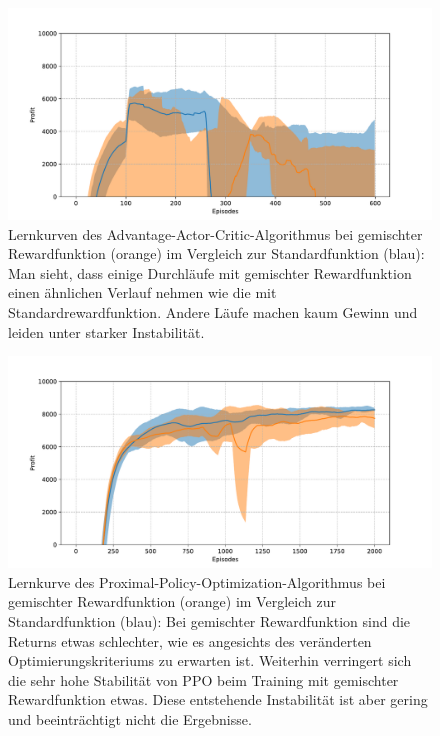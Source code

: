 \begin{figure}[htb]
	\centering
	\includegraphics[width=\textwidth]{appendix/mixed_rewards_a2c.pdf}
	\caption{
		Lernkurven des Advantage-Actor-Critic-Algorithmus bei gemischter Rewardfunktion (orange) im Vergleich zur Standardfunktion (blau):
		Man sieht, dass einige Durchläufe mit gemischter Rewardfunktion einen ähnlichen Verlauf nehmen wie die mit Standardrewardfunktion.
		Andere Läufe machen kaum Gewinn und leiden unter starker Instabilität.
	}
	\label{graphic:MixedRewardsA2C}
\end{figure}
\begin{figure}[htb]
	\centering
	\includegraphics[width=\textwidth]{appendix/mixed_rewards_ppo.pdf}
	\caption{
		Lernkurve des Proximal-Policy-Optimization-Algorithmus bei gemischter Rewardfunktion (orange) im Vergleich zur Standardfunktion (blau):
		Bei gemischter Rewardfunktion sind die Returns etwas schlechter, wie es angesichts des veränderten Optimierungskriteriums zu erwarten ist.
		Weiterhin verringert sich die sehr hohe Stabilität von PPO beim Training mit gemischter Rewardfunktion etwas.
		Diese entstehende Instabilität ist aber gering und beeinträchtigt nicht die Ergebnisse.
	}
	\label{graphic:MixedRewardsPPO}
\end{figure}
